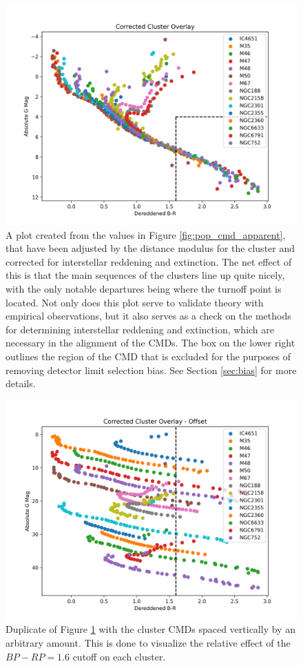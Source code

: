 \documentclass[onecolumn,table,xcdraw,super]{aastex631}
\begin{document}
\begin{figure}[]
    \centering
      \includegraphics[width=4.75in]{figures/pop_cmd_absolute.png}
    \caption{A plot created from the values in Figure \ref{fig:pop_cmd_apparent}, that have been adjusted by the distance modulus for the cluster and corrected for interstellar reddening and extinction. The net effect of this is that the main sequences of the clusters line up quite nicely, with the only notable departures being where the turnoff point is located. Not only does this plot serve to validate theory with empirical observations, but it also serves as a check on the methods for determining interstellar reddening and extinction, which are necessary in the alignment of the CMDs. The box on the lower right outlines the region of the CMD that is excluded for the purposes of removing detector limit selection bias. See Section \ref{sec:bias} for more details.}
    \label{fig:pop_cmd_absolute}
\end{figure}

\begin{figure}[]
    \centering
      \includegraphics[width=4.75in]{figures/pop_cmd_shifted.png}
    \caption{Duplicate of Figure \ref{fig:pop_cmd_absolute} with the cluster CMDs spaced vertically by an arbitrary amount. This is done to visualize the relative effect of the $BP-RP = 1.6$ cutoff on each cluster.}
    \label{fig:pop_cmd_shifted}
\end{figure}
\end{document}

